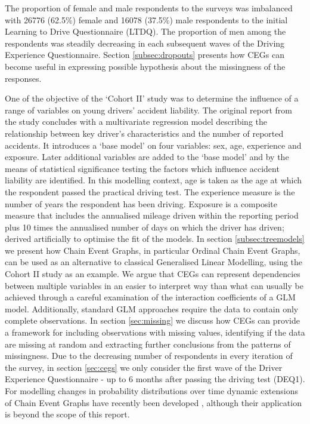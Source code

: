 \documentclass[runningheads]{llncs}
\begin{document}
The proportion of female and male respondents to the surveys was imbalanced with 26776 (62.5\%) female and 16078 (37.5\%) male respondents to the initial Learning to Drive Questionnaire (LTDQ). The proportion of men among the respondents was steadily decreasing in each subsequent waves of the Driving Experience Questionnaire. Section \ref{subsec:dropouts} presents how CEGs can become useful in expressing possible hypothesis about the missingness of the responses.

One of the objective of the `Cohort II' study was to determine the influence of a range of variables on young drivers’ accident liability. The original report from the study \cite{TRL2008cohortii} concludes with a multivariate regression model describing the relationship between key driver's characteristics and the number of reported accidents. It introduces a `base model' on four variables: sex, age, experience and exposure. Later additional variables are added to the `base model' and by the means of statistical significance testing the factors which influence accident liability are identified. In this modelling context, age is taken as the age at which the respondent passed the practical driving test. The experience measure is the number of years the respondent has been driving. Exposure is a composite measure that includes the annualised mileage driven within the reporting period plus 10 times the annualised number of days on which the driver has driven; derived artificially to optimise the fit of the models. 
In section \ref{subsec:treemodels} we present how Chain Event Graphs, in particular Ordinal Chain Event Graphs, can be used as an alternative to classical Generalised Linear Modelling, using the Cohort II study as an example. We argue that CEGs can represent dependencies between multiple variables in an easier to interpret way than what can usually be achieved through a careful examination of the interaction coefficients of a GLM model. Additionally, standard GLM approaches require the data to contain only complete observations. In section \ref{sec:missing} we discuss how CEGs can provide a framework for including observations with missing values, identifying if the data are missing at random and extracting further conclusions from the patterns of missingness.
Due to the decreasing number of respondents in every iteration of the survey, in section \ref{sec:cegs} we only consider the first wave of the Driver Experience Questionnaire - up to 6 months after passing the driving test (DEQ1). For modelling changes in probability distributions over time dynamic extensions of Chain Event Graphs have recently been developed \cite{barclay2015dynamic,collazo2017thesis}, although their application is beyond the scope of this report.
\end{document}
